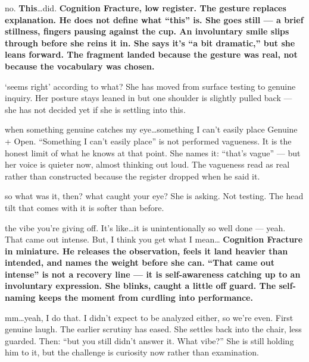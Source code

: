 {no. \textbf{This}\ldots did.}
{\textbf{Cognition Fracture, low register. The gesture replaces explanation. He does not define what ``this'' is. She goes still --- a brief stillness, fingers pausing against the cup. An involuntary smile slips through before she reins it in. She says it's ``a bit dramatic,'' but she leans forward. The fragment landed because the gesture was real, not because the vocabulary was chosen.}}

\thinrule

{`seems right' according to what?}
{She has moved from surface testing to genuine inquiry. Her posture stays leaned in but one shoulder is slightly pulled back --- she has not decided yet if she is settling into this.}

{when something genuine catches my eye\ldots something I can't easily place}
{Genuine + Open. ``Something I can't easily place'' is not performed vagueness. It is the honest limit of what he knows at that point. She names it: ``that's vague'' --- but her voice is quieter now, almost thinking out loud. The vagueness read as real rather than constructed because the register dropped when he said it.}

\thinrule

{so what was it, then? what caught your eye?}
{She is asking. Not testing. The head tilt that comes with it is softer than before.}

{the vibe you're giving off. It's like\ldots it is unintentionally so well done --- yeah. That came out intense. But, I think you get what I mean\ldots}
{\textbf{Cognition Fracture in miniature. He releases the observation, feels it land heavier than intended, and names the weight before she can. ``That came out intense'' is not a recovery line --- it is self-awareness catching up to an involuntary expression. She blinks, caught a little off guard. The self-naming keeps the moment from curdling into performance.}}

\thinrule

{mm\ldots yeah, I do that. I didn't expect to be analyzed either, so we're even.}
{First genuine laugh. The earlier scrutiny has eased. She settles back into the chair, less guarded. Then: ``but you still didn't answer it. What vibe?'' She is still holding him to it, but the challenge is curiosity now rather than examination.}


